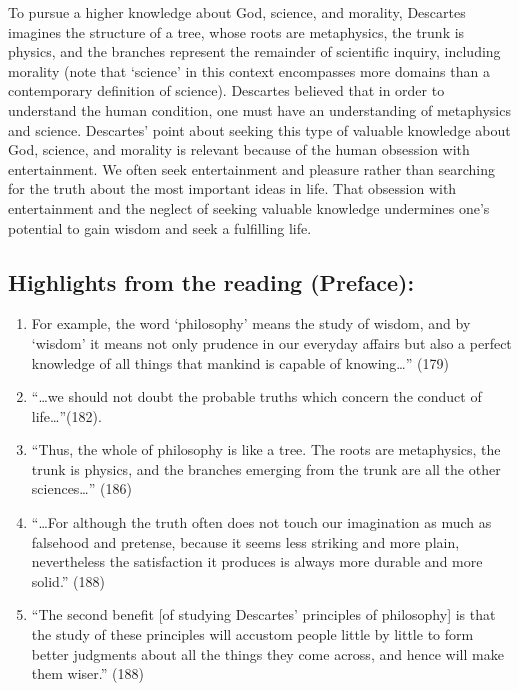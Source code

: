 \documentclass[
]{book}
\providecommand{\tightlist}{%
  \setlength{\itemsep}{0pt}\setlength{\parskip}{0pt}}
\begin{document}
To pursue a higher knowledge about God, science, and morality, Descartes imagines the structure of a tree, whose roots are metaphysics, the trunk is physics, and the branches represent the remainder of scientific inquiry, including morality (note that `science' in this context encompasses more domains than a contemporary definition of science). Descartes believed that in order to understand the human condition, one must have an understanding of metaphysics and science. Descartes' point about seeking this type of valuable knowledge about God, science, and morality is relevant because of the human obsession with entertainment. We often seek entertainment and pleasure rather than searching for the truth about the most important ideas in life. That obsession with entertainment and the neglect of seeking valuable knowledge undermines one's potential to gain wisdom and seek a fulfilling life.

\hypertarget{highlights-from-the-reading-preface}{%
\subsection{Highlights from the reading (Preface):}\label{highlights-from-the-reading-preface}}

\begin{enumerate}
\def\labelenumi{\arabic{enumi}.}
\tightlist
\item
  For example, the word `philosophy' means the study of wisdom, and by `wisdom' it means not only prudence in our everyday affairs but also a perfect knowledge of all things that mankind is capable of knowing\ldots'' (179)
\item
  ``\ldots we should not doubt the probable truths which concern the conduct of life\ldots{}''(182).
\item
  ``Thus, the whole of philosophy is like a tree. The roots are metaphysics, the trunk is physics, and the branches emerging from the trunk are all the other sciences\ldots{}'' (186)
\item
  ``\ldots For although the truth often does not touch our imagination as much as falsehood and pretense, because it seems less striking and more plain, nevertheless the satisfaction it produces is always more durable and more solid.'' (188)
\item
  ``The second benefit {[}of studying Descartes' principles of philosophy{]} is that the study of these principles will accustom people little by little to form better judgments about all the things they come across, and hence will make them wiser.'' (188)
\end{enumerate}
\end{document}
